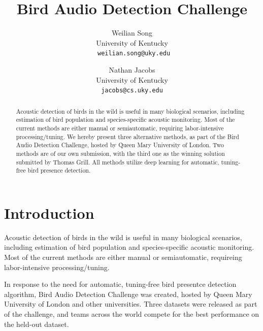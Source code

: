 \documentclass[10pt,twocolumn,letterpaper]{article}
\begin{document}
\title{Bird Audio Detection Challenge}

\author{Weilian Song\\ 
University of Kentucky\\ 
{\tt\small
weilian.song@uky.edu}
\and Nathan Jacobs\\ 
University of Kentucky\\ 
{\tt\small jacobs@cs.uky.edu}
}

\maketitle

\begin{abstract}  

	Acoustic detection of birds in the wild is useful in many biological
	scenarios, including estimation of bird population and species-specific
	acoustic monitoring. Most of the current methods are either manual or
	semiautomatic, requiring labor-intensive processing/tuning. We hereby
	present three alternative methods, as part of the Bird Audio Detection
	Challenge, hosted by Queen Mary University of London. Two methods are of
	our own submission, with the third one as the winning solution submitted
	by Thomas Grill. All methods utilize deep learning for automatic,
	tuning-free bird presence detection.

\end{abstract}

\section{Introduction}

Acoustic detection of birds in the wild is useful in many biological
scenarios, including estimation of bird population and species-specific
acoustic monitoring. Most of the current methods are either manual or
semiautomatic, requireing labor-intensive processing/tuning.

In response to the need for automatic, tuning-free bird presentce detection
algorithm, Bird Audio Detection Challenge was created, hosted by Queen Mary
University of London and other universities. Three datasets were released
as part of the challenge, and teams across the world compete for the best
performance on the held-out dataset.
\end{document}
